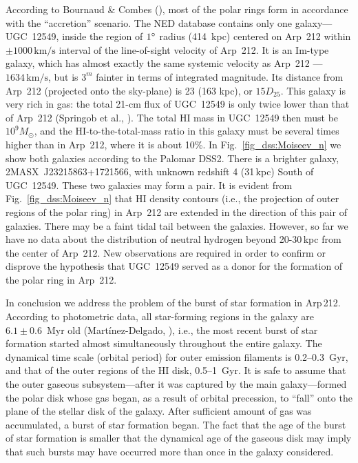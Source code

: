 \documentclass{ab}
\def\degr{\hbox{$^\circ$}}
\newcommand{\km}{\,\mbox{km/s}}
\begin{document}
According to Bournaud   \& Combes (\cite{bc03:Moiseev_n}), most of the polar rings form in accordance with the ``accretion'' scenario. The NED database
contains only one galaxy---UGC~12549, inside the region of
$1\degr$ radius (414~kpc) centered on Arp~212 within
\mbox{$\pm1000\km$} interval of the line-of-sight velocity of
Arp~212. It is an Im-type galaxy, which has almost exactly the
same systemic velocity as Arp~212 --- $1634 \km$, but is $3^m$
fainter in terms of integrated magnitude. Its distance from
Arp~212 (projected onto the sky-plane) is 23 (163 kpc), or
$15D_{25}$. This galaxy is very rich in gas: the total 21-cm flux
of UGC~12549 is only twice lower than that of Arp~212
(Springob et al., \cite{springob05:Moiseev_n}). The total HI mass in UGC~12549 then
must be $10^9 M_{\odot}$, and the HI-to-the-total-mass ratio in
this galaxy must be several times higher than in Arp~212, where it
is about 10\%. In Fig.~\ref{fig_dss:Moiseev_n} we show both
galaxies according to the Palomar DSS2. There is a
brighter galaxy, 2MASX~J23215863+1721566, with unknown redshift
4 (31\,kpc) South of UGC~12549. These two galaxies may form
a pair. It is evident from Fig.~\ref{fig_dss:Moiseev_n} that HI
density contours (i.e., the projection of outer regions of the
polar ring) in Arp~212 are extended in the direction of this pair
of galaxies. There may be a faint tidal tail between the galaxies.
However, so far we have no data about the distribution of neutral
hydrogen beyond \mbox{20-30\,kpc} from the center of  Arp~212. New
observations are required in order to confirm or disprove the
hypothesis that UGC~12549 served as a donor for the formation of
the polar ring in Arp~212.

In conclusion we address the problem of the burst of star
formation in Arp\,212. According to photometric data, all
star-forming regions in the galaxy are $6.1\pm0.6$~Myr old
(Mart\'{i}nez-Delgado, \cite{delgado:Moiseev_n}), i.e., the most recent burst of star
formation started almost simultaneously throughout the entire
galaxy. The dynamical time scale (orbital period) for outer
emission filaments is 0.2--0.3~Gyr, and that of the outer regions
of the HI disk, 0.5--1~Gyr. It is safe to assume that the outer
gaseous subsystem---after it was captured by the main
galaxy---formed the polar disk whose gas began, as a result of
orbital precession, to  ``fall'' onto the plane of the stellar
disk of the galaxy. After sufficient amount of gas was
accumulated, a burst of star formation began. The fact that the
age of the burst of star formation is smaller that the dynamical
age of the gaseous disk may imply that such bursts may have
occurred more than once in the galaxy considered.
\end{document}
